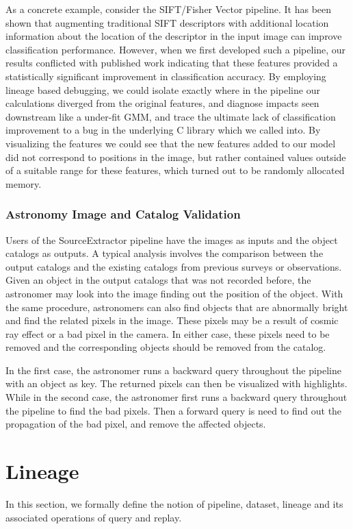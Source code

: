 \documentclass{sig-alternate}
\begin{document}
As a concrete example, consider the SIFT/Fisher Vector pipeline. 
It has been shown that augmenting traditional SIFT descriptors with additional location information about the location of the descriptor in the input image can improve classification performance.
However, when we first developed such a pipeline, our results conflicted with published work indicating that these features provided a statistically significant improvement in classification accuracy.
By employing lineage based debugging, we could isolate exactly where in the pipeline our calculations diverged from the original features, and diagnose impacts seen downstream like a under-fit GMM, and trace the ultimate lack of classification improvement to a bug in the underlying C library which we called into.
By visualizing the features we could see that the new features added to our model did not correspond to positions in the image, but rather contained values outside of a suitable range for these features, which turned out to be randomly allocated memory.


\subsubsection{Astronomy Image and Catalog Validation}
Users of the SourceExtractor pipeline have the images as inputs and the object catalogs as outputs.
A typical analysis involves the comparison between the output catalogs and the existing catalogs from previous surveys or observations.
Given an object in the output catalogs that was not recorded before, the astronomer may look into the image finding out the
position of the object.
With the same procedure, astronomers can also find objects that are abnormally bright and find the related pixels in the image.
These pixels may be a result of cosmic ray effect or a bad pixel in the camera. 
In either case, these pixels need to be removed and the corresponding objects should be removed from the catalog.

In the first case, the astronomer runs a backward query throughout the pipeline with an object as key. 
The returned pixels can then be visualized with highlights.
While in the second case, the astronomer first runs a backward query throughout the pipeline to find the bad pixels. 
Then a forward query is need to find out the propagation of the bad pixel, and remove the affected objects.

\section{Lineage}
\label{sec:Lin}
In this section, we formally define the notion of pipeline, dataset, lineage and its associated operations of query and replay.
\end{document}
